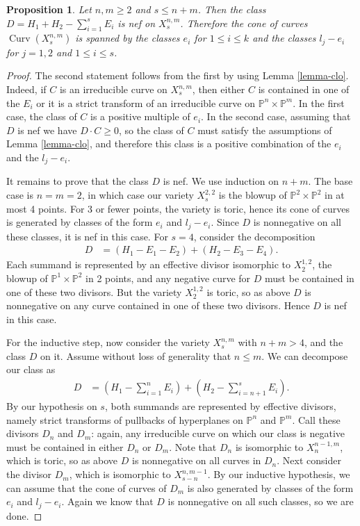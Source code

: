 \documentclass[a4paper,11pt]{article}
\newtheorem{proposition}[theorem]{Proposition}
\newcommand{\PP}{\mathbb P}
\newcommand{\Curv}{\operatorname{Curv}}
\newcommand{\blowup}[3]{X^{#1,#2}_{#3}}
\begin{document}
\begin{proposition}\label{proposition-nefcone}
  Let $n, m \geq 2$ and $s \leq n+m$. Then the class $D= H_1+H_2-\sum_{i=1}^s E_i$ is nef on $X^{n,m}_s$. Therefore the cone of curves $\Curv({X^{n,m}_s})$ is spanned by the classes $e_i$ for $1 \leq i \leq k$ and the classes $l_j-e_i$ for $j=1,2$ and $1 \leq i \leq s$.
\end{proposition}
\begin{proof}
  The second statement follows from the first by using Lemma \ref{lemma-clo}. Indeed, if $C$ is an irreducible curve on $X^{n,m}_s$, then either $C$ is contained in one of the $E_i$ or it is a strict transform of an irreducible curve on $\PP^n\times\PP^m$. In the first case, the class of $C$ is a positive multiple of $e_i$. In the second case, assuming that $D$ is nef we have $D \cdot C \geq 0$, so the class of $C$ must satisfy the assumptions of Lemma \ref{lemma-clo}, and therefore this class is a positive combination of the $e_i$ and the $l_j-e_i$. 
  
  It remains to prove that the class $D$ is nef. We use induction on $n+m$. The base case is $n=m=2$, in which case our variety $\blowup{2}{2}{s}$ is the blowup of $\PP^2 \times \PP^2$ in at most 4 points. For 3 or fewer points, the variety is toric, hence its cone of curves is generated by classes of the form $e_i$ and $l_j-e_i$. Since $D$ is nonnegative on all these classes, it is nef in this case. For $s=4$, consider the decomposition
  \begin{align*}
    D &= \left( H_1-E_1-E_2 \right)+ \left(H_2-E_3-E_4 \right).
  \end{align*}
  Each summand is represented by an effective divisor isomorphic to $\blowup{1}{2}{2}$, the blowup of $\PP^1 \times \PP^2$ in 2 points, and any negative curve for $D$ must be contained in one of these two divisors. But the variety $\blowup{1}{2}{2}$ is toric, so as above $D$ is nonnegative on any curve contained in one of these two divisors. Hence $D$ is nef in this case. 

  For the inductive step, now consider the variety $\blowup{n}{m}{s}$ with $n+m>4$, and the class $D$ on it. Assume without loss of generality that $n \leq m$. We can decompose our class as
  \begin{align*}
    D &= \left( H_1-\sum_{i=1}^n E_i \right) + \left( H_2-\sum_{i=n+1}^s  E_i \right).
  \end{align*}
  By our hypothesis on $s$, both summands are represented by effective divisors, namely strict transforms of pullbacks of hyperplanes on $\PP^n$ and $\PP^m$. Call these divisors $D_n$ and $D_m$: again, any irreducible curve on which our class is negative must be contained in either $D_n$ or $D_m$. Note that $D_n$ is isomorphic to $\blowup{n-1}{m}{n}$, which is toric, so as above $D$ is nonnegative on all curves in $D_n$.  Next consider the divisor $D_m$, which is isomorphic to $\blowup{n}{m-1}{s-n}$. By our inductive hypothesis, we can assume that the cone of curves of $D_m$ is also generated by classes of the form $e_i$ and $l_j-e_i$. Again we know that $D$ is nonnegative on all such classes, so we are done. 
\end{proof}
\end{document}
